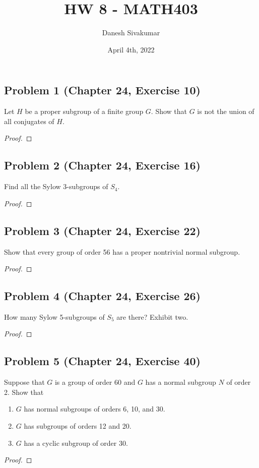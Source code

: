 \documentclass{article}
\title{HW 8 - MATH403}
\author{Danesh Sivakumar}
\date{April 4th, 2022}
\begin{document}
\maketitle 

\subsection*{Problem 1 (Chapter 24, Exercise 10)}
Let $H$ be a proper subgroup of a finite group $G$. Show that $G$ is not the union of all conjugates of $H$.

\begin{proof}

\end{proof}


\subsection*{Problem 2 (Chapter 24, Exercise 16)}
Find all the Sylow 3-subgroups of $S_4$.
\begin{proof}

\end{proof}

\subsection*{Problem 3 (Chapter 24, Exercise 22)}
Show that every group of order 56 has a proper nontrivial normal subgroup.
\begin{proof}

\end{proof}

\subsection*{Problem 4 (Chapter 24, Exercise 26)}
How many Sylow 5-subgroups of $S_5$ are there? Exhibit two.
\begin{proof} 

\end{proof}

\subsection*{Problem 5 (Chapter 24, Exercise 40)}
Suppose that $G$ is a group of order 60 and $G$ has a normal subgroup $N$ of order 2. Show that
\begin{enumerate}[label=\alph*.]
    \item $G$ has normal subgroups of orders 6, 10, and 30.
    \item $G$ has subgroups of orders 12 and 20.
    \item $G$ has a cyclic subgroup of order 30.
\end{enumerate}
\begin{proof} 

\end{proof}
\end{document}
